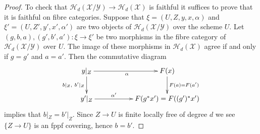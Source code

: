 \documentclass{stacks-project}
\theoremstyle{plain}
\theoremstyle{definition}
\theoremstyle{remark}
\numberwithin{equation}{subsection}
\begin{document}
\begin{proof}
To check that
$\mathcal{H}_d(\mathcal{X}/\mathcal{Y}) \to \mathcal{H}_d(\mathcal{X})$
is faithful it suffices to prove that it is faithful on fibre categories.
Suppose that $\xi = (U, Z, y, x, \alpha)$ and $\xi' = (U, Z', y', x', \alpha')$
are two objects of $\mathcal{H}_d(\mathcal{X}/\mathcal{Y})$ over the
scheme $U$. Let $(g, b, a), (g', b', a') : \xi \to \xi'$ be two morphisms
in the fibre category of $\mathcal{H}_d(\mathcal{X}/\mathcal{Y})$ over $U$.
The image of these morphisms in $\mathcal{H}_d(\mathcal{X})$ agree
if and only if $g = g'$ and $a = a'$. Then the commutative diagram
$$
\xymatrix{
y|_Z \ar[rr]_\alpha \ar[d]_{b|_Z, \ b'|_Z} & &
F(x) \ar[d]^{F(a) = F(a')} \\
y'|_Z \ar[rr]^-{\alpha'} & &
F(g^*x') = F((g')^*x') \\
}
$$
implies that $b|_Z = b'|_Z$. Since $Z \to U$ is finite locally free of degree
$d$ we see $\{Z \to U\}$ is an fppf covering, hence $b = b'$.
\end{proof}
















\end{document}
